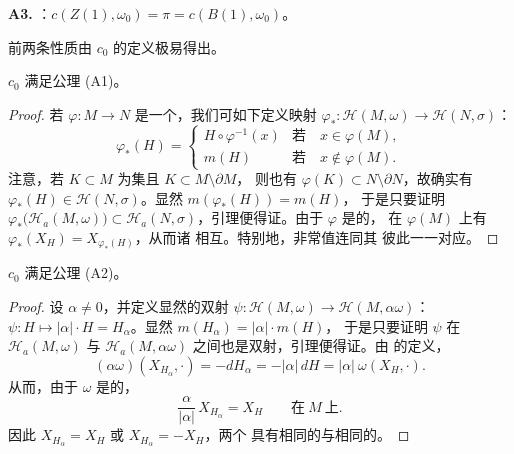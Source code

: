\textbf{A3. \trNormalization}：$c(Z(1),\omega_{0})=\pi=c(B(1),\omega_{0})$。

前两条性质由 $c_{0}$ 的定义极易得出。

\begin{lemma}\label{lem:monotonicity-axiom}
$c_{0}$ 满足\trMonotonicity{}公理 (A1)。
\end{lemma}
\begin{proof}
若 $\varphi:M\to N$ 是一个\trSymplecticEmbedding，我们可如下定义映射%
$\varphi_{*}:\mathcal{H}(M,\omega)\to\mathcal{H}(N,\sigma)$：
\[
\varphi_{*}(H)=
\begin{cases}
H\circ\varphi^{-1}(x) & \text{若}\quad x\in\varphi(M),\\[4pt]
m(H) & \text{若}\quad x\notin\varphi(M).
\end{cases}
\]
注意，若 $K\subset M$ 为\trCompact{}集且 $K\subset M\setminus\partial M$，%
则也有 $\varphi(K)\subset N\setminus\partial N$，故确实有%
$\varphi_{*}(H)\in\mathcal{H}(N,\sigma)$。显然 $m(\varphi_{*}(H))=m(H)$，%
于是只要证明 $\varphi_{*}\bigl(\mathcal{H}_{a}(M,\omega)\bigr)\subset%
\mathcal{H}_{a}(N,\sigma)$，引理便得证。由于 $\varphi$ 是\trSymplectic{}的，%
在 $\varphi(M)$ 上有 $\varphi_{*}(X_H)=X_{\varphi_{*}(H)}$，从而诸\trFlow{}%
相互\trConjugate。特别地，非常值\trPeriodicSolution{}连同其\trPeriodic{}%
彼此一一对应。
\end{proof}

\begin{lemma}\label{lem:conformality-axiom}
$c_{0}$ 满足\trConformality{}公理 (A2)。
\end{lemma}
\begin{proof}
设 $\alpha\neq0$，并定义显然的双射%
$\psi:\mathcal{H}(M,\omega)\to\mathcal{H}(M,\alpha\omega)$：%
$\psi:H\mapsto|\alpha|\cdot H=H_{\alpha}$。显然 $m(H_{\alpha})=|\alpha|\cdot m(H)$，%
于是只要证明 $\psi$ 在 $\mathcal{H}_{a}(M,\omega)$ 与%
$\mathcal{H}_{a}(M,\alpha\omega)$ 之间也是双射，引理便得证。由%
\trHamiltonianVectorField{}的定义，
\[
(\alpha\omega)(X_{H_{\alpha}},\cdot)=-dH_{\alpha}=-|\alpha|\,dH=|\alpha|\ %
\omega(X_{H},\cdot).
\]
从而，由于 $\omega$ 是\trNondegenerate{}的，
\[
\frac{\alpha}{|\alpha|}\,X_{H_{\alpha}}=X_{H}\qquad\text{在}\ M\ \text{上}.
\]
因此 $X_{H_{\alpha}}=X_H$ 或 $X_{H_{\alpha}}=-X_H$，两个\trVectorField{}%
具有相同的\trPeriodicSolution{}与相同的\trPeriodic。
\end{proof}


